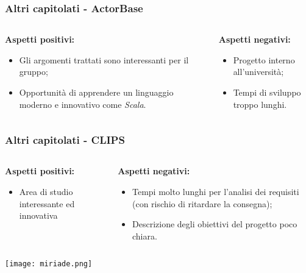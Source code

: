 \begin{frame}
  \frametitle{Altri capitolati - ActorBase}
  \begin{columns}
    \begin{column}{0.4\textwidth}
      \par{\textbf{Aspetti positivi:}}
      \begin{itemize}
      \item Gli argomenti trattati sono interessanti per il gruppo;
      \item Opportunità di apprendere un linguaggio moderno e innovativo come \textit{Scala}.
      \end{itemize}
    \end{column}
    \begin{column}{0.4\textwidth}
      \par{\textbf{Aspetti negativi:}}
      \begin{itemize}
      \item Progetto interno all'università;
      \item Tempi di sviluppo troppo lunghi.
      \end{itemize}
    \end{column}
  \end{columns}
\end{frame}

\begin{frame}
  \frametitle{Altri capitolati - CLIPS}
  \begin{columns}
    \begin{column}{0.4\textwidth}
      \par{\textbf{Aspetti positivi:}}
      \begin{itemize}
      \item Area di studio interessante ed innovativa
      \end{itemize}
    \end{column}
    \begin{column}{0.4\textwidth}
      \par{\textbf{Aspetti negativi:}}
      \begin{itemize}
      \item Tempi molto lunghi per l'analisi dei requisiti (con rischio di ritardare la consegna);
      \item Descrizione degli obiettivi del progetto poco chiara.
      \end{itemize}
    \end{column}
  \end{columns}
  \texttt{[image: miriade.png]}
\end{frame}

